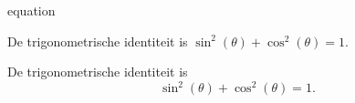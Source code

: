 \documentclass[presentatie.tex]{subfiles}
\begin{document}


\begin{saveblock}{equation}
	\begin{highlightblock}[gobble=8,linewidth=\textwidth,
		framexleftmargin=0.25em,xleftmargin=0.25em]
		De trigonometrische identiteit is
		$ \sin^2(\theta) + \cos^2(\theta) = 1. $

		De trigonometrische identiteit is 
		\begin{equation}
			\sin^2(\theta) + \cos^2(\theta) = 1.
		\end{equation}
	\end{highlightblock}
\end{saveblock}

\end{document}

